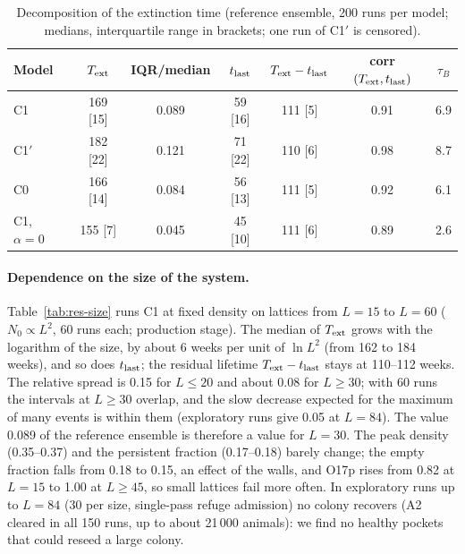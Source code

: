 \begin{table}[t]
  \centering
  \caption{Decomposition of the extinction time (reference ensemble, 200 runs per model; medians,
  interquartile range in brackets; one run of \textsf{C1}$'$ is censored).}
  \label{tab:calib-evs}
  \small
  \begin{tabular}{@{}lcccccc@{}}
    \toprule
    Model & $T_{\rm ext}$ & IQR/median & $t_{\rm last}$ & $T_{\rm ext}-t_{\rm last}$ & corr$(T_{\rm ext},t_{\rm last})$ & $\tau_B$ \\
    \midrule
    \textsf{C1} & 169 [15] & 0.089 & 59 [16] & 111 [5] & 0.91 & 6.9 \\
    \textsf{C1}$'$ & 182 [22] & 0.121 & 71 [22] & 110 [6] & 0.98 & 8.7 \\
    \textsf{C0} & 166 [14] & 0.084 & 56 [13] & 111 [5] & 0.92 & 6.1 \\
    \textsf{C1}, $\alpha=0$ & 155 [7] & 0.045 & 45 [10] & 111 [6] & 0.89 & 2.6 \\
    \bottomrule
  \end{tabular}
\end{table}

\paragraph{Dependence on the size of the system.}
Table~\ref{tab:res-size} runs \textsf{C1} at fixed density on lattices from $L=15$ to $L=60$ ($N_0\propto L^2$, 60
runs each; production stage). The median of $T_{\rm ext}$ grows with the logarithm of the size, by about 6
weeks per unit of $\ln L^2$ (from 162 to 184 weeks), and so does $t_{\rm last}$; the residual lifetime
$T_{\rm ext}-t_{\rm last}$ stays at 110--112 weeks. The relative spread is 0.15 for $L\le20$ and about 0.08 for
$L\ge30$; with 60 runs the intervals at $L\ge30$ overlap, and the slow decrease expected for the maximum of many
events is within them (exploratory runs give 0.05 at $L=84$). The value 0.089 of the reference ensemble is therefore a
value for $L=30$. The peak density (0.35--0.37) and the persistent fraction (0.17--0.18) barely change; the empty
fraction falls from 0.18 to 0.15, an effect of the walls, and O17p rises from 0.82 at $L=15$ to 1.00 at $L\ge45$, so
small lattices fail more often. In exploratory runs up to $L=84$ (30 per size, single-pass refuge admission) no colony recovers
(A2 cleared in all 150 runs, up to about 21\,000 animals): we find no healthy pockets that could reseed a large colony.

